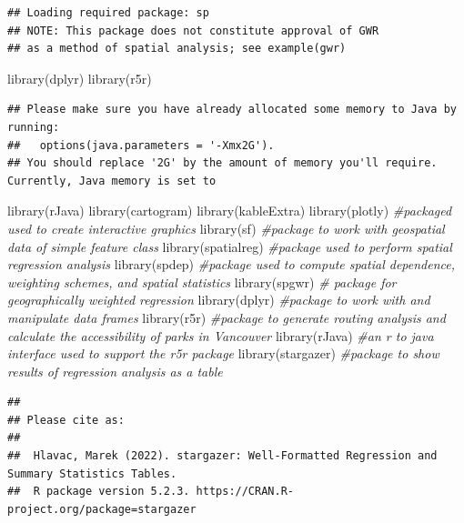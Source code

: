 \documentclass[
]{article}
\newenvironment{Shaded}{\begin{snugshade}}{\end{snugshade}}
\newcommand{\CommentTok}[1]{\textcolor[rgb]{0.56,0.35,0.01}{\textit{#1}}}
\newcommand{\FunctionTok}[1]{\textcolor[rgb]{0.00,0.00,0.00}{#1}}
\newcommand{\NormalTok}[1]{#1}
\begin{document}
\begin{verbatim}
## Loading required package: sp
## NOTE: This package does not constitute approval of GWR
## as a method of spatial analysis; see example(gwr)
\end{verbatim}

\begin{Shaded}
\begin{Highlighting}[]
\FunctionTok{library}\NormalTok{(dplyr)}
\FunctionTok{library}\NormalTok{(r5r)}
\end{Highlighting}
\end{Shaded}

\begin{verbatim}
## Please make sure you have already allocated some memory to Java by running:
##   options(java.parameters = '-Xmx2G').
## You should replace '2G' by the amount of memory you'll require. Currently, Java memory is set to
\end{verbatim}

\begin{Shaded}
\begin{Highlighting}[]
\FunctionTok{library}\NormalTok{(rJava)}
\FunctionTok{library}\NormalTok{(cartogram)}
\FunctionTok{library}\NormalTok{(kableExtra) }
\FunctionTok{library}\NormalTok{(plotly) }\CommentTok{\#packaged used to create interactive graphics }
\FunctionTok{library}\NormalTok{(sf) }\CommentTok{\#package to work with geospatial data of simple feature class}
\FunctionTok{library}\NormalTok{(spatialreg) }\CommentTok{\#package used to perform spatial regression analysis}
\FunctionTok{library}\NormalTok{(spdep) }\CommentTok{\#package used to compute spatial dependence, weighting schemes, and spatial statistics}
\FunctionTok{library}\NormalTok{(spgwr) }\CommentTok{\# package for geographically weighted regression }
\FunctionTok{library}\NormalTok{(dplyr) }\CommentTok{\#package to work with and manipulate data frames}
\FunctionTok{library}\NormalTok{(r5r) }\CommentTok{\#package to generate routing analysis and calculate the accessibility of parks in Vancouver}
\FunctionTok{library}\NormalTok{(rJava) }\CommentTok{\#an r to java interface used to support the r5r package }
\FunctionTok{library}\NormalTok{(stargazer) }\CommentTok{\#package to show results of regression analysis as a table}
\end{Highlighting}
\end{Shaded}

\begin{verbatim}
## 
## Please cite as: 
## 
##  Hlavac, Marek (2022). stargazer: Well-Formatted Regression and Summary Statistics Tables.
##  R package version 5.2.3. https://CRAN.R-project.org/package=stargazer
\end{verbatim}
\end{document}
